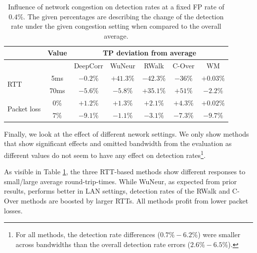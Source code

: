 \documentclass[runningheads,11pt]{llncs}\usepackage[]{graphicx}\usepackage[]{color}
\begin{document}
\begin{table}
\centering
\begin{tabular}{l|c|c|c|c|c|c}
& Value & \multicolumn{5}{c}{TP deviation from average}\\ \hline
 & &DeepCorr & WuNeur & RWalk& C-Over & WM \\ \hline
\multirow{2}{*}{RTT} & 5ms& $-0.2\%$ & $+41.3\%$& $-42.3\%$ & $-36\%$ & $+0.03\%$ \\ \cline{2-7}
 & 70ms & $-5.6\%$ & $-5.8\%$& $+35.1\%$ & $+51\%$& $-2.2\%$\\ \hline

\multirow{2}{*}{Packet loss} & $0\%$ & $+1.2\%$& $+1.3\%$ & $+2.1\%$ & $+4.3\%$ & $+0.02\%$\\ \cline{2-7}
 & $7\%$ & $-9.1\%$& $-1.1\%$ & $-3.1\%$ & $-7.3\%$ & $-9.7\%$\\ \hline %



\end{tabular}
\caption{Influence of network congestion on detection rates at a fixed FP rate of $0.4\%$. The given percentages are describing the change of the detection rate under the given congestion setting when compared to the overall average.}\label{Tab:Congestion}
\end{table}

Finally, we look at the effect of different nework settings. We only show methods that show significant effects and omitted bandwidth from the evaluation as different values do not seem to have any effect on detection rates\footnote{For all methods, the detection rate differences ($0.7\%-6.2\%$) were smaller across bandwidths than the overall detection rate errors ($2.6\%-6.5\%$).}.

As visible in Table \ref{Tab:Congestion}, the three RTT-based methods show different responses to small/large average round-trip-times. While WuNeur, as expected from prior results, performs better in LAN settings, detection rates of the RWalk and C-Over methods are boosted by larger RTTs. All methods profit from lower packet losses.


 
\end{document}
